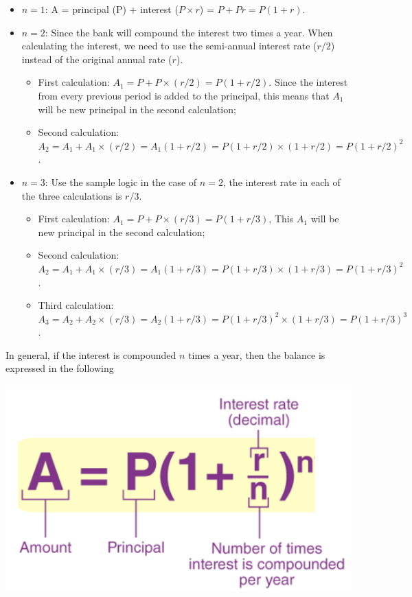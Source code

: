 \documentclass[
]{book}
\begin{document}
\begin{itemize}
\item
  \(n = 1\): A = principal (P) + interest (\(P\times r\)) = \(P + Pr = P(1+r)\).
\item
  \(n =2\): Since the bank will compound the interest two times a year. When calculating the interest, we need to use the semi-annual interest rate (\(r/2\)) instead of the original annual rate (\(r\)).

  \begin{itemize}
  \item
    First calculation: \(A_1 = P + P\times (r/2) = P(1 + r/2)\). Since the interest from every previous period is added to the principal, this means that \(A_1\) will be new principal in the second calculation;
  \item
    Second calculation: \(A_2 = A_1 + A_1 \times (r/2) = A_1(1+r/2) = P(1+r/2)\times (1 + r/2) = P(1 + r/2)^2\).
  \end{itemize}
\item
  \(n = 3\): Use the sample logic in the case of \(n = 2\), the interest rate in each of the three calculations is \(r/3\).

  \begin{itemize}
  \item
    First calculation: \(A_1 = P + P\times (r/3) = P(1 + r/3)\), This \(A_1\) will be new principal in the second calculation;
  \item
    Second calculation: \(A_2 = A_1 + A_1 \times (r/3) = A_1(1+r/3) = P(1+r/3)\times (1 + r/3) = P(1 + r/3)^2\).
  \item
    Third calculation: \(A_3 = A_2 + A_2 \times (r/3) = A_2(1+r/3) = P(1+r/3)^2\times (1 + r/3) = P(1 + r/3)^3\).
  \end{itemize}
\end{itemize}

In general, if the interest is compounded \(n\) times a year, then the balance is expressed in the following

\begin{center}\includegraphics[width=0.45\linewidth]{img04/w04-CompundInterestOneYear} \end{center}
\end{document}
